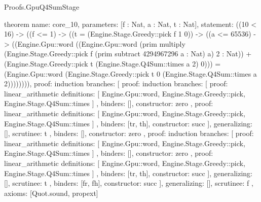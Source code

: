\begin{lexlean}{Proofs.GpuQ4SumStage}
\begin{semanticmodule}
theorem{
  name: core_10,
  parameters: [f : Nat, a : Nat, t : Nat],
  statement: ((10 < 16) -> ((f <= 1) -> ((t = (Engine.Stage.Greedy::pick f 1 0)) -> ((a <= 65536) -> ((Engine.Gpu::word ((Engine.Gpu::word (prim multiply (Engine.Stage.Greedy::pick f (prim subtract 4294967296 a : Nat) a) 2 : Nat)) + (Engine.Stage.Greedy::pick t (Engine.Stage.Q4Sum::times a 2) 0))) = (Engine.Gpu::word (Engine.Stage.Greedy::pick t 0 (Engine.Stage.Q4Sum::times a 2)))))))),
  proof: induction{
    branches: [
      {
        proof: induction{
          branches: [
            {
              proof: linear_arithmetic{
                definitions: [
                  Engine.Gpu::word,
                  Engine.Stage.Greedy::pick,
                  Engine.Stage.Q4Sum::times
                ]
              },
              binders: [],
              constructor: zero
            },
            {
              proof: linear_arithmetic{
                definitions: [
                  Engine.Gpu::word,
                  Engine.Stage.Greedy::pick,
                  Engine.Stage.Q4Sum::times
                ]
              },
              binders: [tr, th],
              constructor: succ
            }
          ],
          generalizing: [],
          scrutinee: t
        },
        binders: [],
        constructor: zero
      },
      {
        proof: induction{
          branches: [
            {
              proof: linear_arithmetic{
                definitions: [
                  Engine.Gpu::word,
                  Engine.Stage.Greedy::pick,
                  Engine.Stage.Q4Sum::times
                ]
              },
              binders: [],
              constructor: zero
            },
            {
              proof: linear_arithmetic{
                definitions: [
                  Engine.Gpu::word,
                  Engine.Stage.Greedy::pick,
                  Engine.Stage.Q4Sum::times
                ]
              },
              binders: [tr, th],
              constructor: succ
            }
          ],
          generalizing: [],
          scrutinee: t
        },
        binders: [fr, fh],
        constructor: succ
      }
    ],
    generalizing: [],
    scrutinee: f
  },
  axioms: [Quot.sound, propext]
}


\end{semanticmodule}
\end{lexlean}
